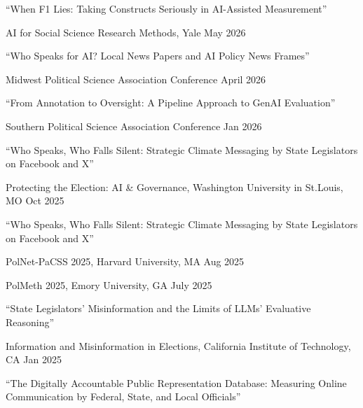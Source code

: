 \documentclass[10.5pt,]{article}
\providecommand{\tightlist}{%
	\setlength{\itemsep}{0pt}\setlength{\parskip}{0pt}}
\renewenvironment{itemize}{
	\begin{list}{}{
			\setlength{\leftmargin}{1.5em}
		}
	}{
	\end{list}
}
\begin{document}
\begin{itemize}
\tightlist
\item
  ``When F1 Lies: Taking Constructs Seriously in AI-Assisted
  Measurement''

  \begin{itemize}
  \tightlist
  \item
    AI for Social Science Research Methods, Yale \hfill May 2026
  \end{itemize}
\item
  ``Who Speaks for AI? Local News Papers and AI Policy News Frames''

  \begin{itemize}
  \tightlist
  \item
    Midwest Political Science Association Conference \hfill April 2026
  \end{itemize}
\item
  ``From Annotation to Oversight: A Pipeline Approach to GenAI
  Evaluation''

  \begin{itemize}
  \tightlist
  \item
    Southern Political Science Association Conference \hfill Jan 2026
  \end{itemize}
\item
  ``Who Speaks, Who Falls Silent: Strategic Climate Messaging by State
  Legislators on Facebook and X''

  \begin{itemize}
  \tightlist
  \item
    Protecting the Election: AI \& Governance, Washington University in
    St.Louis, MO \hfill  Oct 2025
  \end{itemize}
\item
  ``Who Speaks, Who Falls Silent: Strategic Climate Messaging by State
  Legislators on Facebook and X''

  \begin{itemize}
  \tightlist
  \item
    PolNet-PaCSS 2025, Harvard University, MA \hfill Aug 2025
  \item
    PolMeth 2025, Emory University, GA \hfill July 2025
  \end{itemize}
\item
  ``State Legislators' Misinformation and the Limits of LLMs' Evaluative
  Reasoning''

  \begin{itemize}
  \tightlist
  \item
    Information and Misinformation in Elections, California Institute of
    Technology, CA \hfill Jan 2025
  \end{itemize}
\item
  ``The Digitally Accountable Public Representation Database: Measuring
  Online Communication by Federal, State, and Local Oﬀicials''


\end{itemize}
\end{document}
